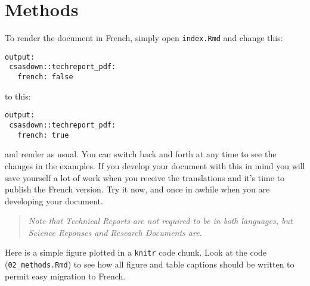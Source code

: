\documentclass[12pt]{article}\usepackage[]{graphicx}\usepackage[]{color}
\begin{document}
\section{Methods}\label{methods}

To render the document in French, simply open \texttt{index.Rmd} and change this:
\begin{verbatim}
output:
 csasdown::techreport_pdf:
   french: false
\end{verbatim}
to this:
\begin{verbatim}
output:
 csasdown::techreport_pdf:
   french: true
\end{verbatim}
and render as usual. You can switch back and forth at any time to see the changes in the examples. If you develop your document with this in mind you will save yourself a lot of work when you receive the translations and it's time to publish the French version. Try it now, and once in awhile when you are developing your document.
\begin{quote}
\emph{Note that Technical Reports are not required to be in both languages, but Science Reponses and Research Documents are.}
\end{quote}
Here is a simple figure plotted in a \texttt{knitr} code chunk. Look at the code (\texttt{02\_methods.Rmd}) to see how all figure and table captions should be written to permit easy migration to French.
\end{document}
